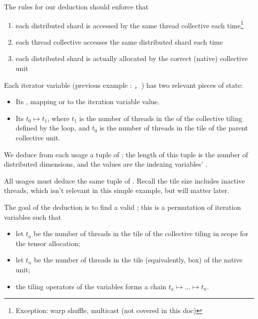 \filbreak
The rules for our deduction should enforce that
\begin{enumerate}
  \item each distributed shard is accessed by the same thread collective each time\footnote{Exception: warp shuffle, multicast (not covered in this doc)}
  \filbreak
  \item each thread collective accesses the same distributed shard each time
  \filbreak
  \item each distributed shard is actually allocated by the correct (native) collective unit
\end{enumerate}

\filbreak
{}

Each  iterator variable (previous example : \texttt{, }) has two relevant pieces of state:
\begin{itemize}
  \item Its , mapping  or  to the iteration variable value.
  \filbreak
  \item Its  $t_0 \mapsto t_1$, where $t_1$ is the number of threads in the  of the collective tiling defined by the  loop, and $t_0$ is the number of threads in the tile of the parent collective unit.
\end{itemize}

\filbreak
We deduce from each usage a tuple of ; the length of this tuple is the number of distributed dimensions, and the values are the indexing variables' .



\filbreak
All usages must deduce the same tuple of .
Recall the tile size includes inactive threads, which isn't relevant in this simple example, but will matter later.

\filbreak
{}

The goal of the deduction is to find a valid ; this is a permutation of  iteration variables such that
\begin{itemize}
  \item let $t_a$ be the number of threads in the tile of the collective tiling in scope for the tensor allocation;
  \item let $t_n$ be the number of threads in the tile (equivalently, box) of the native unit;
  \item the tiling operators of the variables forms a chain $t_a \mapsto ... \mapsto t_n$.
\end{itemize}

